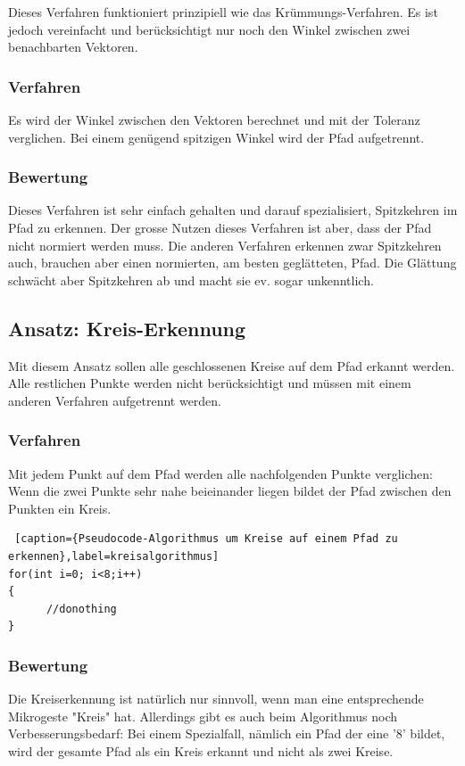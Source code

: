 Dieses Verfahren funktioniert prinzipiell wie das Krümmungs-Verfahren. Es ist jedoch vereinfacht und berücksichtigt nur noch den Winkel zwischen zwei benachbarten Vektoren.

\subsubsection{Verfahren}
Es wird der Winkel zwischen den Vektoren berechnet und mit der Toleranz verglichen. Bei einem genügend spitzigen Winkel wird der Pfad aufgetrennt.

\subsubsection{Bewertung}
Dieses Verfahren ist sehr einfach gehalten und darauf spezialisiert, Spitzkehren im Pfad zu erkennen. Der grosse Nutzen dieses Verfahren ist aber, dass der Pfad nicht normiert werden muss. Die anderen Verfahren erkennen zwar Spitzkehren auch, brauchen aber einen normierten, am besten geglätteten, Pfad. Die Glättung schwächt aber Spitzkehren ab und macht sie ev. sogar unkenntlich.  


\subsection{Ansatz: Kreis-Erkennung}
Mit diesem Ansatz sollen alle geschlossenen Kreise auf dem Pfad erkannt werden. Alle restlichen Punkte werden nicht berücksichtigt und müssen mit einem anderen Verfahren aufgetrennt werden.

\subsubsection{Verfahren}
Mit jedem Punkt auf dem Pfad werden alle nachfolgenden Punkte verglichen: Wenn die zwei Punkte sehr nahe beieinander liegen bildet der Pfad zwischen den Punkten ein Kreis.

\begin{lstlisting} [caption={Pseudocode-Algorithmus um Kreise auf einem Pfad zu erkennen},label=kreisalgorithmus]
for(int i=0; i<8;i++) 
{
      //donothing
}
\end{lstlisting}

\subsubsection{Bewertung}
Die Kreiserkennung ist natürlich nur sinnvoll, wenn man eine entsprechende Mikrogeste "Kreis" hat. Allerdings gibt es auch beim Algorithmus noch Verbesserungsbedarf: Bei einem Spezialfall, nämlich ein Pfad der eine '8' bildet, wird der gesamte Pfad als ein Kreis erkannt und nicht als zwei Kreise. 


